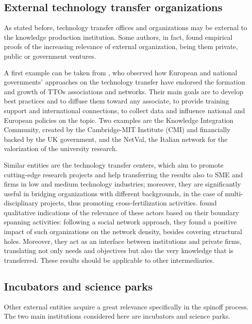 \subsection{External technology transfer organizations}

As stated before, technology transfer offices and organizations may be external to the knowledge production institution. Some authors, in fact, found empirical proofs of the increasing relevance of external organization, being them private, public or government ventures.

A first example can be taken from \citet{Geuna2009}, who observed how European and national governments' approaches on the technology transfer have endorsed the formation and growth of TTOs associations and networks. Their main goals are to develop best practices and to diffuse them toward any associate, to provide training support and international connections, to collect data and influence national and European policies on the topic. Two examples are the Knowledge Integration Community, created by the Cambridge-MIT Institute (CMI) and financially backed by the UK government, and the NetVal, the Italian network for the valorization of the university research.

Similar entities are the technology transfer centers, which aim to promote cutting-edge research projects and help transferring the results also to SME and firms in low and medium technology industries; moreover, they are significantly useful in bridging organizations with different backgrounds, in the case of multi-disciplinary projects, thus promoting cross-fertilization activities. \citet{Comacchio2012} found qualitative indications of the relevance of these actors based on their boundary spanning activities: following a social network approach, they found a positive impact of such organizations on the network density, besides covering structural holes. Moreover, they act as an interface between institutions and private firms, translating not only needs and objectives but also the very knowledge that is transferred. These results should be applicable to other intermediaries.

\subsection{Incubators and science parks}
Other external entities acquire a great relevance specifically in the spinoff process. The two main institutions considered here are incubators and science parks. 

